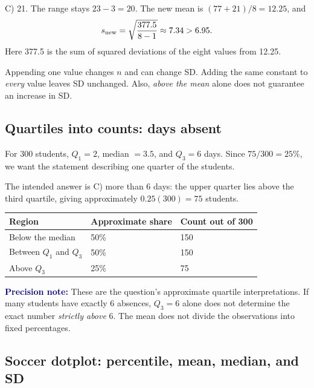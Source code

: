 \documentclass[11pt]{article}
\newcommand{\key}[1]{\textbf{\textcolor{Navy}{#1}}}
\newcommand{\ans}[1]{\textcolor{AnswerBlue}{#1}}
\begin{document}
\begin{answerbox}
\ans{C) 21.} The range stays $23-3=20$. The new mean is $(77+21)/8=12.25$, and
\[
s_{\rm new}=\sqrt{\frac{377.5}{8-1}}\approx7.34>6.95.
\]
Here 377.5 is the sum of squared deviations of the eight values from 12.25.
\end{answerbox}

\begin{trapbox}
Appending one value changes $n$ and can change SD. Adding the same constant to \emph{every} value leaves SD unchanged. Also, \emph{above the mean} alone does not guarantee an increase in SD.
\end{trapbox}

\subsection{Quartiles into counts: days absent}
\label{review:absences}

For 300 students, $Q_1=2$, median $=3.5$, and $Q_3=6$ days. Since $75/300=25\%$, we want the statement describing one quarter of the students.

The intended answer is \ans{C) more than 6 days}: the upper quarter lies above the third quartile, giving approximately $0.25(300)=75$ students.

\begin{center}
\begin{tabular}{lll}
\toprule
Region & Approximate share & Count out of 300\\
\midrule
Below the median & 50\% & 150\\
Between $Q_1$ and $Q_3$ & 50\% & 150\\
Above $Q_3$ & 25\% & 75\\
\bottomrule
\end{tabular}
\end{center}

\key{Precision note:} These are the question's approximate quartile interpretations. If many students have exactly 6 absences, $Q_3=6$ alone does not determine the exact number \emph{strictly above} 6. The mean does not divide the observations into fixed percentages.

\clearpage
\subsection{Soccer dotplot: percentile, mean, median, and SD}
\label{review:soccer}
\end{document}
